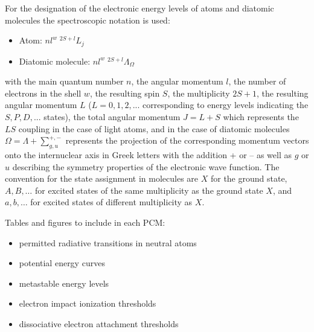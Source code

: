 For the designation of the electronic energy levels of atoms and diatomic
molecules the spectroscopic notation is used:\\

\begin{itemize}
\item Atom: $nl^w\; {}^{2S+l}L_j$\\
\item Diatomic molecule: $nl^w\; {}^{2S+l}\Lambda_\Omega$
\end{itemize}
 
with the main quantum number $n$, the angular momentum $l$, the number of electrons
in the shell $w$, the resulting spin $S$, the multiplicity $2S + 1$, the resulting angular
momentum $L$ ($L = 0, 1, 2,...$ corresponding to energy levels indicating the $S, P, D,. . .$ 
states), the total angular momentum $J = L+S$ which represents the  $LS$ coupling in
the case of light atoms, and in the case of diatomic molecules  $\Omega =\Lambda + \sum_{g,u}^{+,-}$ represents
the projection of the corresponding momentum vectors onto the internuclear axis in
Greek letters with the addition + or – as well as $g$ or $u$ describing the symmetry
properties of the electronic wave function. The convention for the state assignment in
molecules are $X$ for the ground state, $A, B,\ldots$ for excited states of the same multiplicity
as the ground state $X$, and $a, b,\ldots$ for excited states of different multiplicity as $X$.

Tables and figures to include in each PCM:

\begin{itemize}
\item permitted radiative transitions in neutral atoms
\item potential energy curves
\item metastable energy levels
\item electron impact ionization thresholds
\item dissociative electron attachment thresholds
\end{itemize}



